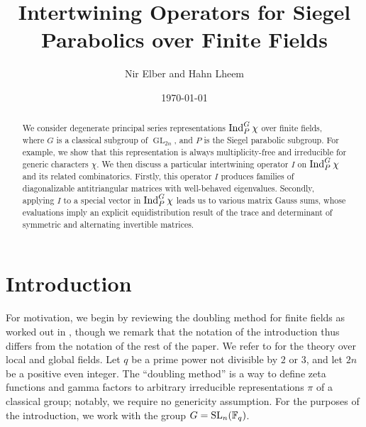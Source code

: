 \documentclass{amsart}
\title{Intertwining Operators for Siegel Parabolics over Finite Fields}
\author{Nir Elber and Hahn Lheem}
\date{\today}
\begin{document}
\begin{abstract}
    We consider degenerate principal series representations $\operatorname{Ind}_P^G\chi$ over finite fields, where $G$ is a classical subgroup of $\operatorname{GL}_{2n}$, and $P$ is the Siegel parabolic subgroup. For example, we show that this representation is always multiplicity-free and irreducible for generic characters $\chi$. We then discuss a particular intertwining operator $I$ on $\operatorname{Ind}_P^G\chi$ and its related combinatorics. Firstly, this operator $I$ produces families of diagonalizable antitriangular matrices with well-behaved eigenvalues. Secondly, applying $I$ to a special vector in $\operatorname{Ind}_P^G\chi$ leads us to various matrix Gauss sums, whose evaluations imply an explicit equidistribution result of the trace and determinant of symmetric and alternating invertible matrices.
\end{abstract}

\maketitle


\tableofcontents

\section{Introduction}
For motivation, we begin by reviewing the doubling method for finite fields as worked out in \cite{chang-doubling}, though we remark that the notation of the introduction thus differs from the notation of the rest of the paper. We refer to \cite{ps-r-doubling} for the theory over local and global fields. Let $q$ be a prime power not divisible by $2$ or $3$, and let $2n$ be a positive even integer. The ``doubling method'' is a way to define zeta functions and gamma factors to arbitrary irreducible representations $\pi$ of a classical group; notably, we require no genericity assumption. For the purposes of the introduction, we work with the group $G=\operatorname{SL}_n(\mathbb F_q)$.
\end{document}
